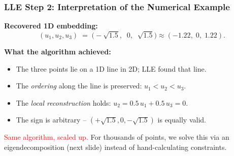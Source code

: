 \documentclass[notes,11pt, aspectratio=169]{beamer}
\begin{document}
\begin{frame}
\frametitle{LLE Step 2: Interpretation of the Numerical Example}

\textbf{Recovered 1D embedding:}
\[
    (u_1, u_2, u_3) \;=\; \bigl(-\sqrt{1.5},\;\; 0,\;\; \sqrt{1.5}\bigr) \approx (-1.22,\; 0,\; 1.22).
\]

\vspace{8pt}
\begin{center}
\end{center}

\vspace{6pt}
\textbf{What the algorithm achieved:}
\begin{itemize}
    \item The three points lie on a 1D line in 2D; LLE found that line.
    \item The \emph{ordering} along the line is preserved: $u_1 < u_2 < u_3$.
    \item The \emph{local reconstruction} holds: $u_2 = 0.5\,u_1 + 0.5\,u_3 = 0$.
    \item The sign is arbitrary -- $(+\sqrt{1.5}, 0, -\sqrt{1.5})$ is equally valid.
\end{itemize}

\vspace{6pt}
\textcolor{red}{Same algorithm, scaled up.} For thousands of points, we solve this via an eigendecomposition (next slide) instead of hand-calculating constraints.
\end{frame}
\end{document}
